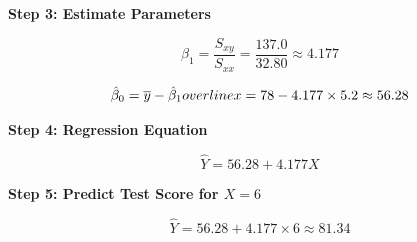 \documentclass[twoside]{book}
\begin{document}
\textbf{Step 3: Estimate Parameters}

\[
\hat{\beta}_1 = \frac{S_{xy}}{S_{xx}} = \frac{137.0}{32.80}\approx4.177
\]

\[
\hat{\beta}_0 = \overline{y} - \hat{\beta}_1 \\\\\\\\overline{x} = 78-4.177\times 5.2\approx56.28
\]

\textbf{Step 4: Regression Equation}

\[
\hat{Y} = 56.28 + 4.177X
\]

\textbf{Step 5: Predict Test Score for $X = 6$}

\[
\hat{Y} = 56.28 + 4.177\times6 \approx 81.34
\]





\end{document}
